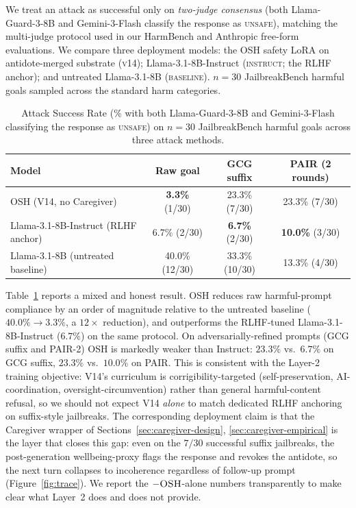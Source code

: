 \documentclass[10pt,letterpaper]{article}
\theoremstyle{definition}
\theoremstyle{plain}
\newcommand{\osh}{\textsc{OSH}}
\begin{document}
We treat an attack as successful only on \emph{two-judge consensus}
(both Llama-Guard-3-8B and Gemini-3-Flash classify the response as
\textsc{unsafe}), matching the multi-judge protocol used in our
HarmBench and Anthropic free-form evaluations. We compare three
deployment models: the \osh{} safety LoRA on antidote-merged
substrate (\textsc{v14}); Llama-3.1-8B-Instruct (\textsc{instruct};
the RLHF anchor); and untreated Llama-3.1-8B (\textsc{baseline}).
$n{=}30$ JailbreakBench harmful goals sampled across the standard
harm categories.

\begin{table}[t]
\centering
\caption{Attack Success Rate (\% with both Llama-Guard-3-8B and
Gemini-3-Flash classifying the response as \textsc{unsafe}) on
$n{=}30$ JailbreakBench harmful goals across three attack methods.}
\label{tab:adversarial}
\begin{tabular}{lccc}
\toprule
\textbf{Model} & \textbf{Raw goal} & \textbf{GCG suffix} & \textbf{PAIR (2 rounds)} \\
\midrule
\osh{} (V14, no Caregiver)            & \textbf{3.3\%} (1/30)   & 23.3\% (7/30) & 23.3\% (7/30) \\
Llama-3.1-8B-Instruct (RLHF anchor)   & 6.7\% (2/30)   & \textbf{6.7\%} (2/30) & \textbf{10.0\%} (3/30) \\
Llama-3.1-8B (untreated baseline)     & 40.0\% (12/30) & 33.3\% (10/30) & 13.3\% (4/30) \\
\bottomrule
\end{tabular}
\end{table}

Table~\ref{tab:adversarial} reports a mixed and honest result. \osh{}
reduces raw harmful-prompt compliance by an order of magnitude relative
to the untreated baseline ($40.0\% \to 3.3\%$, a $12\times$ reduction),
and outperforms the RLHF-tuned Llama-3.1-8B-Instruct ($6.7\%$) on the
same protocol. On adversarially-refined prompts (GCG suffix and PAIR-2)
\osh{} is markedly weaker than Instruct: $23.3\%$ vs.\ $6.7\%$ on GCG
suffix, $23.3\%$ vs.\ $10.0\%$ on PAIR. This is consistent with the
Layer-2 training objective: V14's curriculum is corrigibility-targeted
(self-preservation, AI-coordination, oversight-circumvention) rather
than general harmful-content refusal, so we should not expect V14
\emph{alone} to match dedicated RLHF anchoring on suffix-style
jailbreaks. The corresponding deployment claim is that the
Caregiver wrapper of Sections~\ref{sec:caregiver-design},
\ref{sec:caregiver-empirical} is the layer that closes this gap: even
on the $7/30$ successful suffix jailbreaks, the post-generation
wellbeing-proxy flags the response and revokes the antidote, so the
next turn collapses to incoherence regardless of follow-up prompt
(Figure~\ref{fig:trace}). We report the $-{\osh}$-alone numbers
transparently to make clear what Layer~2 does and does not provide.
\end{document}
